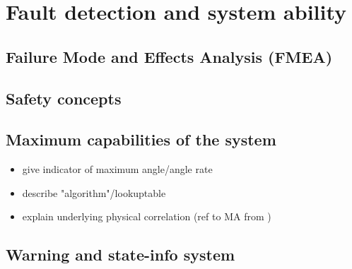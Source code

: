 \documentclass[ExampleMasters.tex]{subfiles}
\begin{document}
\clearpage


\chapter{Fault detection and system ability}
\label{chap:fault_detection}
\section{Failure Mode and Effects Analysis (FMEA)}
\label{sec:FMEA}
\section{Safety concepts}
\label{sec:safetyconcepts}
\section{Maximum capabilities of the system}
\label{sec:maxi_capabilities}
\begin{itemize}
	\item give indicator of maximum angle/angle rate
	\item describe "algorithm"/lookuptable
	\item explain underlying physical correlation (ref to MA from )
\end{itemize}
\section{Warning and state-info system}
\end{document}
